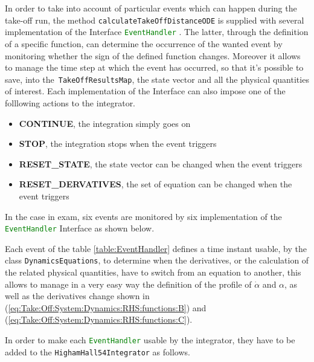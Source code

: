 \bigskip
\noindent
In order to take into account of particular events which can happen during the take-off run, the method \lstinline[language=Java]!calculateTakeOffDistanceODE! is supplied with several implementation of the \gls{Interface} \lstinline[language=Java]!EventHandler! \cite{apache:ode}. The latter, through the definition of a specific function, can determine the occurrence of the wanted event by monitoring whether the sign of the defined function changes. Moreover it allows to manage the time step at which the event has occurred, so that it's possible to save, into the~\lstinline[language=Java]!TakeOffResultsMap!, the state vector and all the physical quantities of interest. Each implementation of the \gls{Interface} can also impose one of the folllowing actions to the integrator.
%
\begin{itemize}
\item \textbf{CONTINUE}, the integration simply goes on
\item \textbf{STOP}, the integration stops when the event triggers
\item \textbf{RESET_STATE}, the state vector can be changed when the event triggers 
\item \textbf{RESET_DERVATIVES}, the set of equation can be changed when the event triggers 
\end{itemize}
%
In the case in exam, six events are monitored by six implementation of the \lstinline[language=Java]!EventHandler! \gls{Interface} as shown below.

\noindent
Each event of the table \ref{table:EventHandler} defines a time instant usable, by the class \lstinline[language=Java]!DynamicsEquations!, to determine when the derivatives, or the calculation of the related physical quantities, have to switch from an equation to another, this allows to manage in a very easy way the definition of the profile of $\dot\alpha$ and $\alpha$, as well as the derivatives change shown in (\ref{eq:Take:Off:System:Dynamics:RHS:functions:B}) and (\ref{eq:Take:Off:System:Dynamics:RHS:functions:C}).  

\bigskip
\noindent
In order to make each \lstinline[language=Java]!EventHandler! usable by the integrator, they have to be added to the \lstinline[language=Java]!HighamHall54Integrator! as follows.

